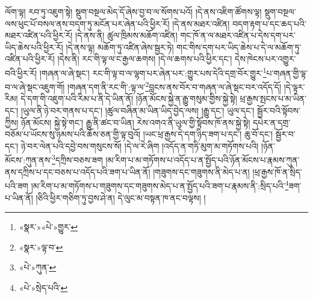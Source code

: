 ལོག་ལྟ། རབ་ཏུ་འཇུག་སྟེ། སྡུག་བསྔལ་མེད་དོ་ཞེས་བྱ་བ་ལ་སོགས་པའོ། །དེ་ནས་འཇིག་ཚོགས་ལྟ། སྡུག་བསྔལ་ལས་ཕུང་པོ་བསལ་ནས་བདག་ཏུ་མངོན་པར་ཞེན་པའི་ཕྱིར་རོ། །དེ་ནས་མཐར་འཛིན། བདག་རྟག་པ་དང་ཆད་པའི་མཐར་འཛིན་པའི་ཕྱིར་རོ། །དེ་ནས་ནི། ཚུལ་ཁྲིམས་མཆོག་འཛིན། གང་ཁོ་ན་ལ་མཐར་འཛིན་པ་དེས་དག་པར་ཡིད་ཆེས་པའི་ཕྱིར་རོ། །དེ་ནས་ལྟ། མཆོག་ཏུ་འཛིན་ཞེས་སྦྱར་ཏེ། གང་གིས་དག་པར་ཡིད་ཆེས་པ་དེ་ལ་མཆོག་ཏུ་འཛིན་པའི་ཕྱིར་རོ། །དེས་ནི། རང་གི་ལྟ་ལ་ང་རྒྱལ་ཆགས། །དེ་ལ་ཆགས་པའི་ཕྱིར་དང་། དེས་ཁེངས་པར་འགྱུར་བའི་ཕྱིར་རོ། །གཞན་ལ་ཞེ་སྡང་། རང་གི་ལྟ་བ་ལ་ལྷག་པར་ཞེན་པར་:གྱུར་པས་དེའི་དགྲ་བོར་གྱུར་\footnote{«སྣར་»«པེ་»གྱུར་}པ་གཞན་གྱི་ལྟ་བ་ལ་ཞེ་སྡང་འཇུག་གོ། །གཞན་དག་ནི་རང་གི་:ལྟ་ལ་\footnote{«སྣར་»ལྟ་བ་}བླངས་ནས་བོར་བ་གཞན་ལ་ཞེ་སྡང་བར་འདོད་དོ། །དེ་ལྟར་རིམ། དེ་དག་གི་འཇུག་པའི་རིམ་པ་ནི་དེ་ཡིན་ནོ། །ཉོན་མོངས་སྐྱེ་ན་རྒྱུ་གསུམ་གྱིས་སྐྱེ་སྟེ། ཕྲ་རྒྱས་སྤངས་པ་མ་ཡིན་དང་། །ཡུལ་ནི་ཉེ་བར་གནས་པ་དང་། །ཚུལ་བཞིན་མ་ཡིན་ཡིད་བྱེད་ལས། །རྒྱུ་དང་། ཡུལ་དང་། སྦྱོར་བའི་སྟོབས་ཀྱིས། ཉོན་མོངས། སྐྱེ་སྟེ་གང་། རྒྱུ་ནི་ཚང་བ་ཡིན། རེས་འགའ་ནི་ཡུལ་གྱི་སྟོབས་ཁོ་ནས་སྐྱེ་སྟེ། དཔེར་ན་དགྲ་བཅོམ་པ་ཡོངས་སུ་ཉམས་པའི་ཆོས་ཅན་གྱི་ལྟ་བུའོ། །ཡང་ཕྲ་རྒྱས་དེ་དག་ཉིད་ཟག་པ་དང་། ཆུ་བོ་དང་། སྦྱོར་བ་དང་། ཉེ་བར་ལེན་པའི་དབྱེ་བས་གསུངས་སོ། །དེ་ལ་རེ་ཞིག །འདོད་ན་གཏི་མུག་མ་གཏོགས་པའི། །ཉོན་མོངས་:ཀུན་ནས་\footnote{«པེ་»ཀུན་}དཀྲིས་བཅས་ཟག །མ་རིག་པ་མ་གཏོགས་པ་འདོད་པ་ན་སྤྱོད་པའི་ཉོན་མོངས་པ་རྣམས་ཀུན་ནས་དཀྲིས་པ་དང་བཅས་པ་འདོད་པའི་ཟག་པ་ཡིན་ནོ། །གཟུགས་དང་གཟུགས་ནི་མེད་པ་ན། །ཕྲ་རྒྱས་ཁོ་ན་སྲིད་པའི་ཟག །མ་རིག་པ་མ་གཏོགས་པ་གཟུགས་དང་གཟུགས་མེད་པ་ན་སྤྱོད་པའི་ཟག་པ་རྣམས་ནི་:སྲིད་པའི་\footnote{«པེ་»སྲེད་པའི་}ཟག་པ་ཡིན་ནོ། །ཅིའི་ཕྱིར་གཅིག་ཏུ་བྱས་ཤེ་ན། དེ་ལུང་མ་བསྟན་ཁ་ནང་བལྟས། །
